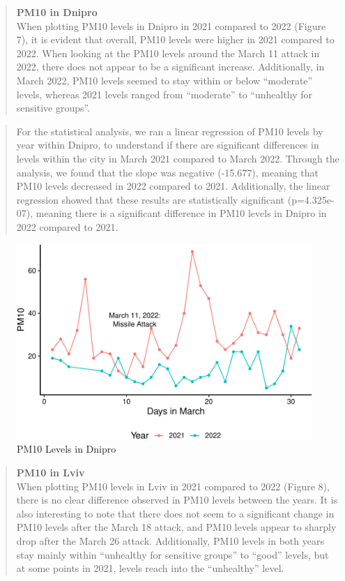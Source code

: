 \documentclass[
  12pt,
]{article}
\begin{document}
\newpage

\begin{quote}
\textbf{PM10 in Dnipro}\\
When plotting PM10 levels in Dnipro in 2021 compared to 2022 (Figure 7),
it is evident that overall, PM10 levels were higher in 2021 compared to
2022. When looking at the PM10 levels around the March 11 attack in
2022, there does not appear to be a significant increase. Additionally,
in March 2022, PM10 levels seemed to stay within or below ``moderate''
levels, whereas 2021 levels ranged from ``moderate'' to ``unhealthy for
sensitive groups''.
\end{quote}

\begin{quote}
For the statistical analysis, we ran a linear regression of PM10 levels
by year within Dnipro, to understand if there are significant
differences in levels within the city in March 2021 compared to March
2022. Through the analysis, we found that the slope was negative
(-15.677), meaning that PM10 levels decreased in 2022 compared to 2021.
Additionally, the linear regression showed that these results are
statistically significant (p=4.325e-07), meaning there is a significant
difference in PM10 levels in Dnipro in 2022 compared to 2021.
\end{quote}

\begin{figure}
\centering
\includegraphics{Fontanie_Gordon_Weinberg_Project_files/figure-latex/visualizing PM10 in Dnipro-1.pdf}
\caption{PM10 Levels in Dnipro}
\end{figure}

\newpage

\begin{quote}
\textbf{PM10 in Lviv}\\
When plotting PM10 levels in Lviv in 2021 compared to 2022 (Figure 8),
there is no clear difference observed in PM10 levels between the years.
It is also interesting to note that there does not seem to a significant
change in PM10 levels after the March 18 attack, and PM10 levels appear
to sharply drop after the March 26 attack. Additionally, PM10 levels in
both years stay mainly within ``unhealthy for sensitive groups'' to
``good'' levels, but at some points in 2021, levels reach into the
``unhealthy'' level.
\end{quote}
\end{document}
